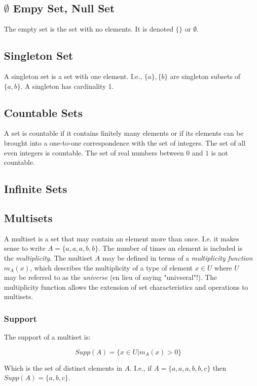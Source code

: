 \subsection{$\emptyset$ Empy Set, Null Set}
The empty set is the set with no elements. It is denoted $\{\}$ or $\emptyset$. 

\subsection{Singleton Set}
A singleton set is a set with one element. I.e., $\{a\}, \{b\}$ are singleton subsets of $\{a,b\}$. A singleton has cardinality 1.

\subsection{Countable Sets}
A set is countable if it contains finitely many elements or if its elements can be brought into a one-to-one correspondence with the set of integers. The set of all even integers is countable. The set of real numbers between $0$ and $1$ is not countable.

\subsection{Infinite Sets}

\subsection{Multisets}
A multiset is a set that may contain an element more than once. I.e. it makes sense to write $A=\{a,a,a,b,b\}$. The number of times an element is included is the \textit{multiplicity}. The multiset $A$ may be defined in terms of a \textit{multiplicity function} $m_A(x)$, which describes the multiplicity of a type of element $x\in U$ where $U$ may be referred to as the \textit{universe} (en lieu of saying "univseral"!). The multiplicity function allows the extension of set characteristics and operations to multisets.

\subsubsection{Support}
The support of a multiset is:

\begin{equation}
Supp(A) = \{ x\in U | 	m_A(x)>0\}
\end{equation} 

Which is the set of distinct elements in $A$. I.e., if $A = \{a,a,a,b,b,c\}$ then $Supp(A) = \{a,b,c\}$.

